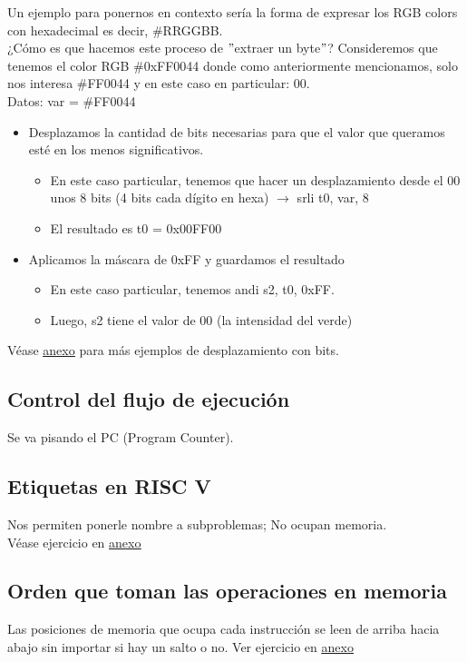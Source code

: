\documentclass[10pt,a4paper]{article}
\begin{document}
Un ejemplo para ponernos en contexto sería la forma de expresar los RGB colors con hexadecimal es decir, \#RRGGBB. \\
¿Cómo es que hacemos este proceso de $"$extraer un byte$"$? Consideremos que tenemos el color RGB \#0xFF0044 donde como anteriormente mencionamos, solo nos interesa \#FF0044 y en este caso en particular: 00. \\
Datos: 
var = \#FF0044 
\begin{itemize}
    \item Desplazamos la cantidad de bits necesarias para que el valor que queramos esté en los menos significativos.
    \begin{itemize}
        \item En este caso particular, tenemos que hacer un desplazamiento desde el 00 unos 8 bits (4 bits cada dígito en hexa) $ \rightarrow $ srli t0, var, 8
        \item El resultado es t0 = 0x00FF00
    \end{itemize}
    \item Aplicamos la máscara de 0xFF y guardamos el resultado
    \begin{itemize}
        \item En este caso particular, tenemos andi s2, t0, 0xFF.
        \item Luego, s2 tiene el valor de 00 (la intensidad del verde)
    \end{itemize}
\end{itemize} 
Véase \hyperref[subsec:desplazamiento_bits]{\underline{anexo}} para más ejemplos de desplazamiento con bits.
\subsection*{Control del flujo de ejecución}
Se va pisando el PC (Program Counter). 
\subsection*{Etiquetas en RISC V}
Nos permiten ponerle nombre a subproblemas; No ocupan memoria. \\

Véase ejercicio en \hyperref[subsec:ejercicios_con_saltos_condicionales_incondicionales]{\underline{anexo}}
\subsection*{Orden que toman las operaciones en memoria}
Las posiciones de memoria que ocupa cada instrucción se leen de arriba hacia abajo sin importar si hay un salto o no.
Ver ejercicio en \hyperref[subsec:TPRVC]{\underline{anexo}} 
\end{document}
